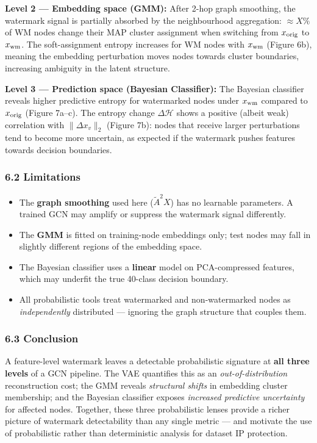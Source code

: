 \documentclass[11pt]{article}
\providecommand{\tightlist}{%
      \setlength{\itemsep}{0pt}\setlength{\parskip}{0pt}}
\begin{document}
\textbf{Level 2 --- Embedding space (GMM):} After 2-hop graph smoothing,
the watermark signal is partially absorbed by the neighbourhood
aggregation: \(\approx X\%\) of WM nodes change their MAP cluster
assignment when switching from \(x_{\rm orig}\) to \(x_{\rm wm}\). The
soft-assignment entropy increases for WM nodes with \(x_{\rm wm}\)
(Figure 6b), meaning the embedding perturbation moves nodes towards
cluster boundaries, increasing ambiguity in the latent structure.

\textbf{Level 3 --- Prediction space (Bayesian Classifier):} The
Bayesian classifier reveals higher predictive entropy for watermarked
nodes under \(x_{\rm wm}\) compared to \(x_{\rm orig}\) (Figure 7a--c).
The entropy change \(\Delta\mathcal{H}\) shows a positive (albeit weak)
correlation with \(\|\Delta x_v\|_2\) (Figure 7b): nodes that receive
larger perturbations tend to become more uncertain, as expected if the
watermark pushes features towards decision boundaries.

\subsubsection{6.2 Limitations}\label{limitations}

\begin{itemize}
\tightlist
\item
  The \textbf{graph smoothing} used here (\(\tilde{A}^2 X\)) has no
  learnable parameters. A trained GCN may amplify or suppress the
  watermark signal differently.
\item
  The \textbf{GMM} is fitted on training-node embeddings only; test
  nodes may fall in slightly different regions of the embedding space.
\item
  The Bayesian classifier uses a \textbf{linear} model on PCA-compressed
  features, which may underfit the true 40-class decision boundary.
\item
  All probabilistic tools treat watermarked and non-watermarked nodes as
  \emph{independently} distributed --- ignoring the graph structure that
  couples them.
\end{itemize}

\subsubsection{6.3 Conclusion}\label{conclusion}

A feature-level watermark leaves a detectable probabilistic signature at
\textbf{all three levels} of a GCN pipeline. The VAE quantifies this as
an \emph{out-of-distribution} reconstruction cost; the GMM reveals
\emph{structural shifts} in embedding cluster membership; and the
Bayesian classifier exposes \emph{increased predictive uncertainty} for
affected nodes. Together, these three probabilistic lenses provide a
richer picture of watermark detectability than any single metric --- and
motivate the use of probabilistic rather than deterministic analysis for
dataset IP protection.
\end{document}
